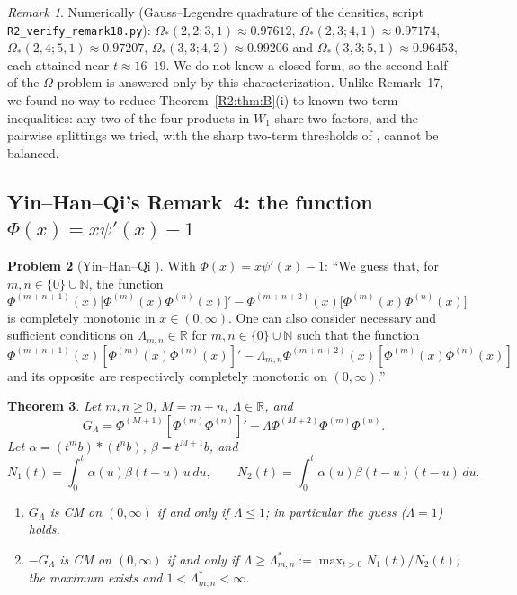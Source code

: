 \documentclass[11pt]{amsart}
\newtheorem{theorem}{Theorem}[section]
\theoremstyle{definition}
\newtheorem{problem}[theorem]{Problem}
\theoremstyle{remark}
\newtheorem{remark}[theorem]{Remark}
\begin{document}
\begin{remark}\label{R2:rem:B-num}
Numerically (Gauss--Legendre quadrature of the densities, script
\texttt{R2\_\allowbreak{}verify\_\allowbreak{}remark18.py}): $\Omega_*(2,2;3,1)\approx0.97612$,
$\Omega_*(2,3;4,1)\approx0.97174$, $\Omega_*(2,4;5,1)\approx0.97207$,
$\Omega_*(3,3;4,2)\approx0.99206$ and $\Omega_*(3,3;5,1)\approx0.96453$, each
attained near $t\approx16$--$19$. We do not know a closed form, so the
second half of the $\Omega$-problem is answered only by this
characterization. Unlike Remark~17, we found no way to reduce
Theorem~\ref{R2:thm:B}(i) to known two-term inequalities: any two of the four
products in $W_1$ share two factors, and the pairwise splittings we tried,
with the sharp two-term thresholds of \cite{R2-QiRM2021}, cannot be
balanced.
\end{remark}

\subsection{Yin--Han--Qi's Remark~4: the function \texorpdfstring{$\Phi(x)=x\psi'(x)-1$}{Phi(x)=x psi'(x)-1}}
\label{R2:subsec:C}

\begin{problem}[{Yin--Han--Qi \cite[Remark~4]{R2-YHQ2024}}]\label{R2:prob:C}
With $\Phi(x)=x\psi'(x)-1$: ``We guess that, for $m,n\in\{0\}\cup\mathbb N$,
the function
\[
 \Phi^{(m+n+1)}(x)\big[\Phi^{(m)}(x)\Phi^{(n)}(x)\big]'-\Phi^{(m+n+2)}(x)\big[\Phi^{(m)}(x)\Phi^{(n)}(x)\big]
\]
is completely monotonic in $x\in(0,\infty)$. One can also consider necessary
and sufficient conditions on $\Lambda_{m,n}\in\mathbb R$ for
$m,n\in\{0\}\cup\mathbb N$ such that the function
\[
 \Phi^{(m+n+1)}(x)\left[\Phi^{(m)}(x)\Phi^{(n)}(x)\right]'-\Lambda_{m,n}\Phi^{(m+n+2)}(x)\left[\Phi^{(m)}(x)\Phi^{(n)}(x)\right]
\]
and its opposite are respectively completely monotonic on $(0,\infty)$.''
\end{problem}

\begin{theorem}\label{R2:thm:C}
Let $m,n\ge0$, $M=m+n$, $\Lambda\in\mathbb R$, and
\[
 G_\Lambda=\Phi^{(M+1)}[\Phi^{(m)}\Phi^{(n)}]'-\Lambda\Phi^{(M+2)}\Phi^{(m)}\Phi^{(n)}.
\]
Let $\alpha=(t^mb)*(t^nb)$, $\beta=t^{M+1}b$, and
\[
 N_1(t)=\int_0^t\alpha(u)\beta(t-u)\,u\,du,\qquad
 N_2(t)=\int_0^t\alpha(u)\beta(t-u)(t-u)\,du .
\]
\begin{enumerate}
\item[(i)] $G_\Lambda$ is CM on $(0,\infty)$ if and only if $\Lambda\le1$;
 in particular the guess ($\Lambda=1$) holds.
\item[(ii)] $-G_\Lambda$ is CM on $(0,\infty)$ if and only if
 $\Lambda\ge\Lambda^*_{m,n}:=\max_{t>0}N_1(t)/N_2(t)$; the maximum exists and
 $1<\Lambda^*_{m,n}<\infty$.
\end{enumerate}
\end{theorem}
\end{document}
